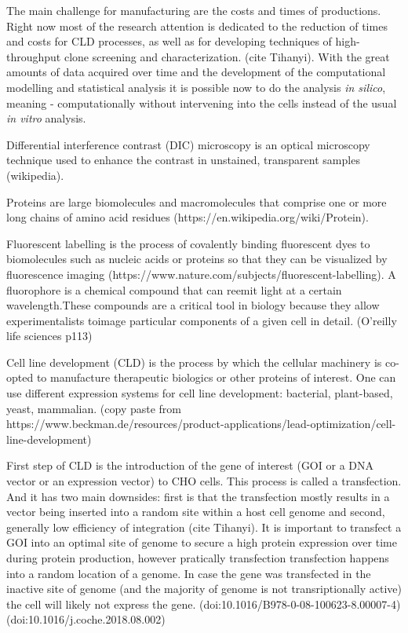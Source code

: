 The main challenge for manufacturing are the costs and times of productions. Right now most of the research attention is dedicated to the reduction of times and costs for CLD processes, as well as for developing techniques of high-throughput clone screening and characterization. (cite Tihanyi). With the great amounts of data acquired over time and the development of the computational modelling and statistical analysis it is possible now to do the analysis \textit{in silico}, meaning - computationally without intervening into the cells instead of the usual \textit{in vitro} analysis.

Differential interference contrast (DIC) microscopy is an optical microscopy technique used to enhance the contrast in unstained, transparent samples (wikipedia).

Proteins are large biomolecules and macromolecules that comprise one or more long chains of amino acid residues (https://en.wikipedia.org/wiki/Protein).

Fluorescent labelling is the process of covalently binding fluorescent dyes to biomolecules such as nucleic acids or proteins so that they can be visualized by fluorescence imaging (https://www.nature.com/subjects/fluorescent-labelling). A fluorophore is a chemical compound that can reemit light at a certain wavelength.These compounds are a critical tool in biology because they allow experimentalists toimage particular components of a given cell in detail. (O'reilly life sciences p113)

Cell line development (CLD) is the process by which the cellular machinery is co-opted to manufacture therapeutic biologics or other proteins of interest. One can use different expression systems for cell line development: bacterial, plant-based, yeast, mammalian. (copy paste from https://www.beckman.de/resources/product-applications/lead-optimization/cell-line-development)


First step of CLD is the introduction of the gene of interest (GOI or a DNA vector or an expression vector) to CHO cells. This process is called a transfection. And it has two main downsides: first is that the transfection mostly results in a vector being inserted into a random site within a host cell genome and second, generally low efficiency of integration (cite Tihanyi). It is important to transfect a GOI into an optimal site of genome to secure a high protein expression over time during protein production, however pratically transfection transfection happens into a random location of a genome. In case the gene was transfected in the inactive site of genome (and the majority of genome is not transriptionally active) the cell will likely not express the gene. (doi:10.1016/B978-0-08-100623-8.00007-4) (doi:10.1016/j.coche.2018.08.002)

